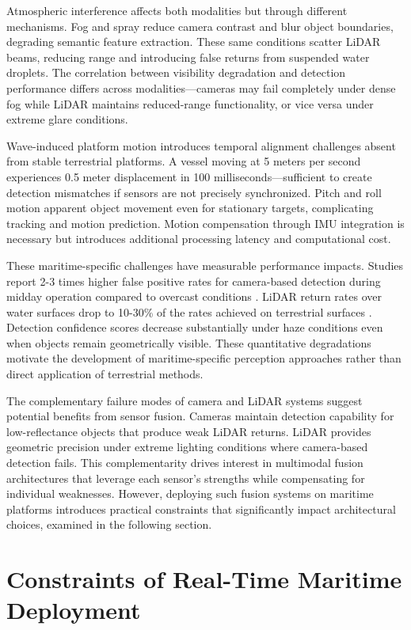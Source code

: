 \documentclass[../main.tex]{subfiles}
\begin{document}
Atmospheric interference affects both modalities but through different mechanisms. Fog and spray reduce camera contrast and blur object boundaries, degrading semantic feature extraction. These same conditions scatter LiDAR beams, reducing range and introducing false returns from suspended water droplets. The correlation between visibility degradation and detection performance differs across modalities—cameras may fail completely under dense fog while LiDAR maintains reduced-range functionality, or vice versa under extreme glare conditions.

Wave-induced platform motion introduces temporal alignment challenges absent from stable terrestrial platforms. A vessel moving at 5 meters per second experiences 0.5 meter displacement in 100 milliseconds—sufficient to create detection mismatches if sensors are not precisely synchronized. Pitch and roll motion apparent object movement even for stationary targets, complicating tracking and motion prediction. Motion compensation through IMU integration is necessary but introduces additional processing latency and computational cost.

These maritime-specific challenges have measurable performance impacts. Studies report 2-3 times higher false positive rates for camera-based detection during midday operation compared to overcast conditions \cite{prasad2017, landaeta, liebergall}. LiDAR return rates over water surfaces drop to 10-30\% of the rates achieved on terrestrial surfaces \cite{kunz2005}. Detection confidence scores decrease substantially under haze conditions even when objects remain geometrically visible. These quantitative degradations motivate the development of maritime-specific perception approaches rather than direct application of terrestrial methods.

The complementary failure modes of camera and LiDAR systems suggest potential benefits from sensor fusion. Cameras maintain detection capability for low-reflectance objects that produce weak LiDAR returns. LiDAR provides geometric precision under extreme lighting conditions where camera-based detection fails. This complementarity drives interest in multimodal fusion architectures that leverage each sensor's strengths while compensating for individual weaknesses. However, deploying such fusion systems on maritime platforms introduces practical constraints that significantly impact architectural choices, examined in the following section.

\section{Constraints of Real-Time Maritime Deployment}
\end{document}
